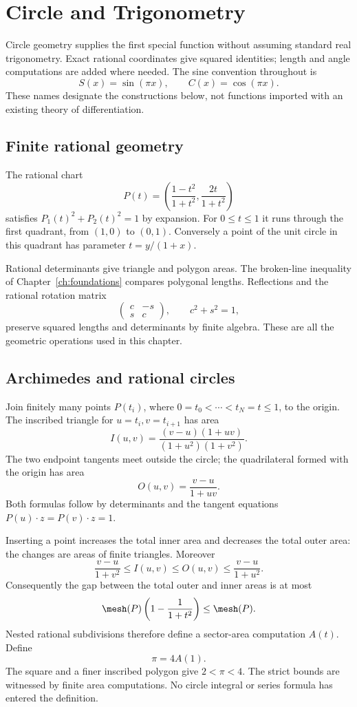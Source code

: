 \chapter{Circle and Trigonometry}\label{ch:rational-circle-trigonometry}

Circle geometry supplies the first special function without assuming
standard real trigonometry.  Exact rational coordinates give squared
identities; length and angle computations are added where needed.  The
sine convention throughout is
\[
 S(x)=\sin(\pi x),\qquad C(x)=\cos(\pi x).
\]
These names designate the constructions below, not functions imported with
an existing theory of differentiation.

\section{Finite rational geometry}
\label{thm:rational-circle-pythagorean}
The rational chart
\[
 P(t)=\left(\frac{1-t^2}{1+t^2},\frac{2t}{1+t^2}\right)
\]
satisfies $P_1(t)^2+P_2(t)^2=1$ by expansion.  For $0\le t\le1$ it runs
through the first quadrant, from $(1,0)$ to $(0,1)$.  Conversely a point of
the unit circle in this quadrant has parameter $t=y/(1+x)$.

Rational determinants give triangle and polygon areas.  The broken-line
inequality of Chapter~\ref{ch:foundations} compares polygonal lengths.
Reflections and the rational rotation matrix
\[
 \begin{pmatrix}c&-s\\s&c\end{pmatrix},\qquad c^2+s^2=1,
\]
preserve squared lengths and determinants by finite algebra.  These are all
the geometric operations used in this chapter.

\section{Archimedes and rational circles}
\label{thm:geometric-pi-validity}
Join finitely many points $P(t_i)$, where
$0=t_0<\cdots<t_N=t\le1$, to the origin.  The inscribed triangle for
$u=t_i,v=t_{i+1}$ has area
\[
 I(u,v)=\frac{(v-u)(1+uv)}{(1+u^2)(1+v^2)}.
\]
The two endpoint tangents meet outside the circle; the quadrilateral formed
with the origin has area
\[
 O(u,v)=\frac{v-u}{1+uv}.
\]
Both formulas follow by determinants and the tangent equations
$P(u)\mathbin{\cdot}z=P(v)\mathbin{\cdot}z=1$.

Inserting a point increases the total inner area and decreases the total
outer area: the changes are areas of finite triangles.  Moreover
\[
 \frac{v-u}{1+v^2}\le I(u,v)\le O(u,v)
       \le\frac{v-u}{1+u^2}.
\]
Consequently the gap between the total outer and inner areas is at most
\[
 \mesh(P)\left(1-\frac1{1+t^2}\right)\le\mesh(P).
\]
Nested rational subdivisions therefore define a sector-area computation
$A(t)$.  Define
\[
 \pi=4A(1).
\]
The square and a finer inscribed polygon give $2<\pi<4$.  The strict
bounds are witnessed by finite area computations.  No circle integral or
series formula has entered the definition.

